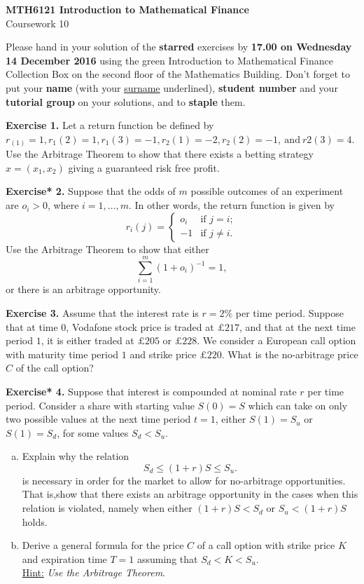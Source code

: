 \documentclass[11pt,a4paper]{article}
\begin{document}
    \begin{center}
        \LARGE\textbf{MTH6121 Introduction to Mathematical Finance}\\
        Coursework 10
    \end{center}
    Please hand in your solution of the \textbf{starred} exercises by \textbf{17.00 on Wednesday 14 December 2016} using the green Introduction to Mathematical Finance Collection Box on the second floor of the Mathematics Building. Don’t forget to put your \textbf{name} (with your \underline{surname} underlined), \textbf{student number} and your \textbf{tutorial group} on your solutions, and to \textbf{staple} them.\par 
    \textbf{Exercise 1.} Let a return function be defined by $r_(1) = 1, r_1(2) = 1, r_1(3) = −1, r_2(1) = −2, r_2(2) = −1,\ \text{and}\ r2(3) = 4$. Use the Arbitrage Theorem to show that there exists a betting strategy $x = (x_1, x_2)$ giving a guaranteed risk free profit.\par 
    \textbf{Exercise* 2.} Suppose that the odds of $m$ possible outcomes of an experiment are $o_i > 0$, where $i = 1,\ldots , m$. In other words, the return function is given by
    $$
    r_i(j)
    =
    \begin{cases}
        o_i & \text{if $j=i$};\\
        -1 & \text{if $j \neq i$}.
    \end{cases}
    $$
    Use the Arbitrage Theorem to show that either
    $$
    \sum_{i=1}^m(1+o_i)^{-1}=1,
    $$
    or there is an arbitrage opportunity.\par 
    \textbf{Exercise 3.} Assume that the interest rate is $r = 2\%$ per time period. Suppose that at time $0$, Vodafone stock price is traded at $\pounds 217$, and that at the next time period $1$, it is either traded at $\pounds 205$ or $\pounds 228$. We consider a European call option with maturity time period $1$ and strike price $\pounds 220$. What is the no-arbitrage price $C$ of the call option?\par 
    \textbf{Exercise* 4.} Suppose that interest is compounded at nominal rate $r$ per time period. Consider a share with starting value $S(0) = S$ which can take on only two possible values at the next time period $t = 1$, either $S(1) = S_u$ or $S(1) = S_d$, for some values $S_d < S_u$.
    \begin{enumerate}[(a)]
        \item Explain why the relation
        \begin{equation}
            S_d \leq (1+r)S \leq S_u.
        \end{equation}
        is necessary in order for the market to allow for no-arbitrage opportunities. That is,show that there exists an arbitrage opportunity in the cases when this relation is violated, namely when either $(1 + r)S < S_d$ or $S_u < (1 + r)S$ holds.
        \item Derive a general formula for the price $C$ of a call option with strike price $K$ and expiration time $T = 1$ assuming that $S_d < K < S_u$.\\
        \underline{Hint:} \textsl{Use the Arbitrage Theorem}.
    \end{enumerate}
\end{document}
